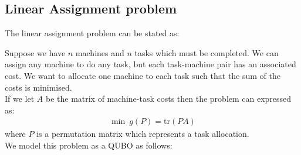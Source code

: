 \documentclass{article}
\begin{document}
\subsection{Linear Assignment problem}

The linear assignment problem can be stated as:

Suppose we have \(n\) machines and \(n\) tasks which must be completed. We can assign any machine to do any task, but each task-machine pair has an associated cost. We want to allocate one machine to each task such that the sum of the costs is minimised. \\

\noindent If we let \(A\) be the matrix of machine-task costs then the problem can expressed as: 
\begin{align*}
    \min \: g(P) = \text{tr}(PA)
\end{align*}
where \(P\) is a permutation matrix which represents a task allocation. \\

\noindent We model this problem as a QUBO as follows: \\ 
\end{document}

